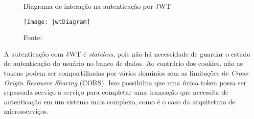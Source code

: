 \begin{figure}
	\centering
	\caption{Diagrama de interação na autenticação por JWT}
  \texttt{[image: jwtDiagram]}
  \caption*{Fonte: \cite{jwt}}
\label{fig:jwtDiagram}
\end{figure}

A autenticação com JWT é \textit{stateless}, pois não há necessidade de guardar o estado de autenticação do usuário no banco de dados. Ao contrário dos cookies, não as tokens podem ser compartilhadas por vários domínios sem as limitações de \textit{Cross-Origin Resource Sharing} (CORS). Isso possibilita que uma única token possa ser repassada serviço a serviço para completar uma transação que necessita de autenticação em um sistema mais complexo, como é o caso da arquitetura de microsserviços.
